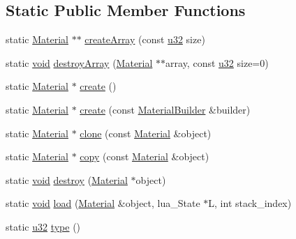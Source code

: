 \subsection*{Static Public Member Functions}
\begin{DoxyCompactItemize}
\item 
static \mbox{\hyperlink{classnjli_1_1_material}{Material}} $\ast$$\ast$ \mbox{\hyperlink{classnjli_1_1_material_ace089b72b670f4dff85bdde77f0c17a4}{create\+Array}} (const \mbox{\hyperlink{_util_8h_a10e94b422ef0c20dcdec20d31a1f5049}{u32}} size)
\item 
static \mbox{\hyperlink{_thread_8h_af1e856da2e658414cb2456cb6f7ebc66}{void}} \mbox{\hyperlink{classnjli_1_1_material_a6095f4248e3366d802bd585f0e75e7c9}{destroy\+Array}} (\mbox{\hyperlink{classnjli_1_1_material}{Material}} $\ast$$\ast$array, const \mbox{\hyperlink{_util_8h_a10e94b422ef0c20dcdec20d31a1f5049}{u32}} size=0)
\item 
static \mbox{\hyperlink{classnjli_1_1_material}{Material}} $\ast$ \mbox{\hyperlink{classnjli_1_1_material_a72bd6ccb8f216e2f5c4d054b297a55e6}{create}} ()
\item 
static \mbox{\hyperlink{classnjli_1_1_material}{Material}} $\ast$ \mbox{\hyperlink{classnjli_1_1_material_a3e040d6afaa59825df4c3df3edcefdb3}{create}} (const \mbox{\hyperlink{classnjli_1_1_material_builder}{Material\+Builder}} \&builder)
\item 
static \mbox{\hyperlink{classnjli_1_1_material}{Material}} $\ast$ \mbox{\hyperlink{classnjli_1_1_material_ae92845d754b6ff837489c461bb0072ee}{clone}} (const \mbox{\hyperlink{classnjli_1_1_material}{Material}} \&object)
\item 
static \mbox{\hyperlink{classnjli_1_1_material}{Material}} $\ast$ \mbox{\hyperlink{classnjli_1_1_material_a3296d34a077b014a02001bbf876eab80}{copy}} (const \mbox{\hyperlink{classnjli_1_1_material}{Material}} \&object)
\item 
static \mbox{\hyperlink{_thread_8h_af1e856da2e658414cb2456cb6f7ebc66}{void}} \mbox{\hyperlink{classnjli_1_1_material_afcb45b24c6865b6743ab60589c255975}{destroy}} (\mbox{\hyperlink{classnjli_1_1_material}{Material}} $\ast$object)
\item 
static \mbox{\hyperlink{_thread_8h_af1e856da2e658414cb2456cb6f7ebc66}{void}} \mbox{\hyperlink{classnjli_1_1_material_acbf12f3b3abb3f7ea02d9bc2acfb8028}{load}} (\mbox{\hyperlink{classnjli_1_1_material}{Material}} \&object, lua\+\_\+\+State $\ast$L, int stack\+\_\+index)
\item 
static \mbox{\hyperlink{_util_8h_a10e94b422ef0c20dcdec20d31a1f5049}{u32}} \mbox{\hyperlink{classnjli_1_1_material_a94b5c1de306550320577208339a4bec6}{type}} ()
\end{DoxyCompactItemize}
